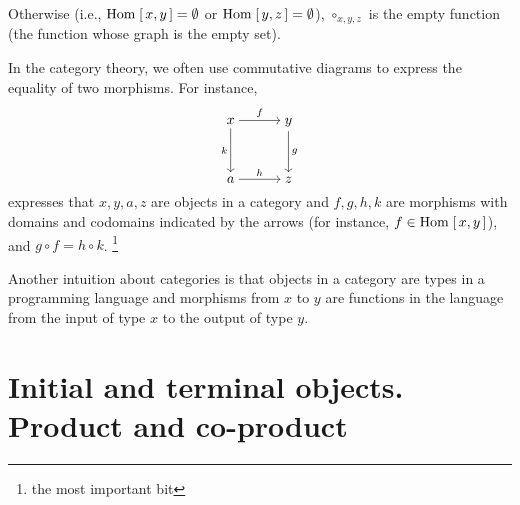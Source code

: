 \begin{enumcirc}
\begin{itemize}
		      Otherwise (i.e., $\textrm{Hom}_{\textrm{\tiny \ensuremath{{}_{}}}}\left[ \, x, y \, \right] = \emptyset$ or $\textrm{Hom}_{\textrm{\tiny \ensuremath{{}_{}}}}\left[ \, y, z \, \right] = \emptyset$),
		      $\circ_{x,y,z}$ is the empty function
		      (the function whose graph is the empty set).
	\end{itemize}
	\item
	In the category theory, we often use commutative diagrams to express the
	equality of two morphisms.
	For instance,
	\[
		\begin{tikzcd}[cramped, sep=3em]
			x
			\arrow[r, "f"]
			\arrow[d, swap, "k"] &
			y
			\arrow[d, "g"]\\
			a
			\arrow[r,"h"] &
			z
		\end{tikzcd}
	\]
	expresses that $x, y, a, z$ are objects in a category and $f, g, h, k$ are
	morphisms with domains and codomains indicated by the arrows (for instance, $f
		\in \textrm{Hom}_{\textrm{\tiny \ensuremath{{}_{}}}}\left[ \, x, y \, \right]$), and $g \circ f = h \circ k$.
	\footnote{the most important bit}
	\item
	Another intuition about categories is that objects in a category are types in a
	programming language and morphisms from $x$ to $y$ are functions in the
	language from the input of type $x$ to the output of type $y$.
\end{enumcirc}

\section{Initial and terminal objects. Product and co-product}

